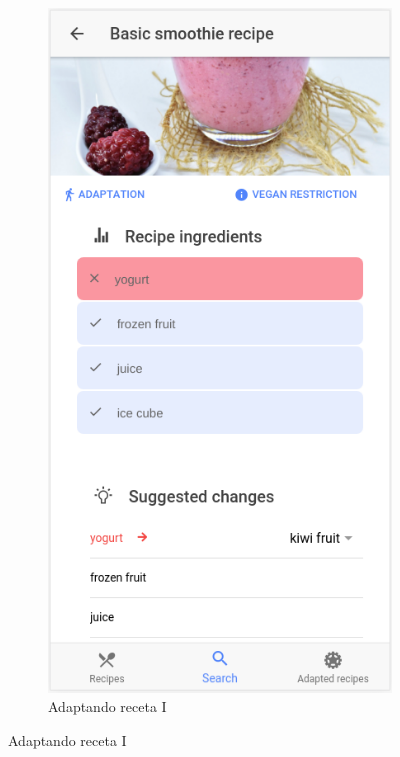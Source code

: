\begin{figure}[H]
\begin{subfigure}[b]{0.30\linewidth}
    \end{subfigure}
    \begin{subfigure}[b]{0.301\linewidth}
        \includegraphics[width=\linewidth]{imagenes/app/pantallas/ejemplo11.png}
        \caption{Adaptando receta I}
        \label{fig:ejemplo11}

\end{subfigure}
\end{figure}
